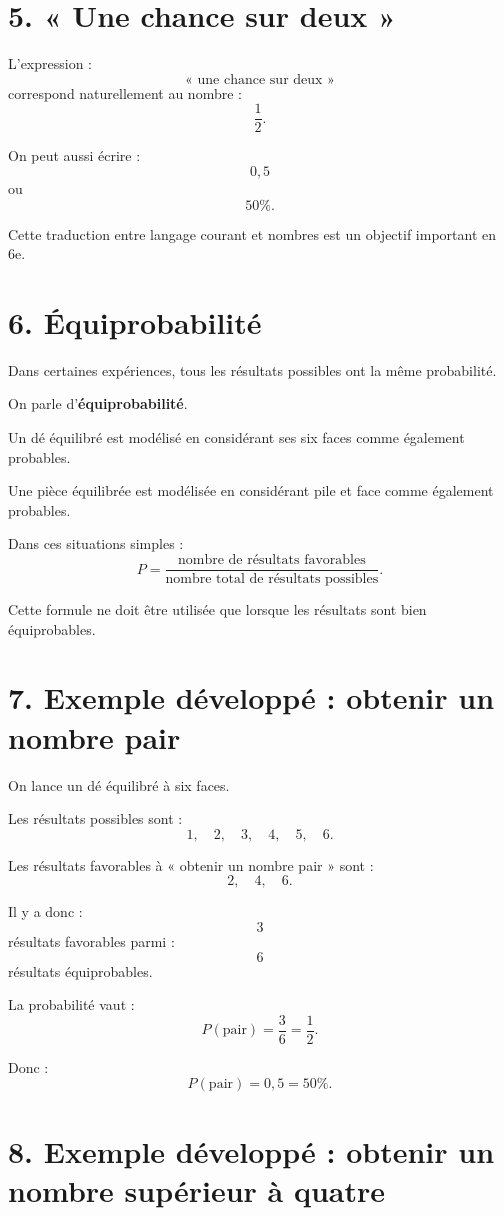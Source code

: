 \section{5. « Une chance sur deux »}

L'expression :
\[
\text{« une chance sur deux »}
\]
correspond naturellement au nombre :
\[
\dfrac12.
\]

On peut aussi écrire :
\[
0{,}5
\]
ou
\[
50\%.
\]

Cette traduction entre langage courant et nombres est un objectif important en 6e.

\section{6. Équiprobabilité}

Dans certaines expériences, tous les résultats possibles ont la même probabilité.

On parle d'\textbf{équiprobabilité}.

Un dé équilibré est modélisé en considérant ses six faces comme également probables.

Une pièce équilibrée est modélisée en considérant pile et face comme également probables.

Dans ces situations simples :
\[
P=\dfrac{\text{nombre de résultats favorables}}{\text{nombre total de résultats possibles}}.
\]

Cette formule ne doit être utilisée que lorsque les résultats sont bien équiprobables.

\section{7. Exemple développé : obtenir un nombre pair}

On lance un dé équilibré à six faces.

Les résultats possibles sont :
\[
1,\quad2,\quad3,\quad4,\quad5,\quad6.
\]

Les résultats favorables à « obtenir un nombre pair » sont :
\[
2,\quad4,\quad6.
\]

Il y a donc :
\[
3
\]
résultats favorables parmi :
\[
6
\]
résultats équiprobables.

La probabilité vaut :
\[
P(\text{pair})=\dfrac36=\dfrac12.
\]

Donc :
\[
\boxed{P(\text{pair})=0{,}5=50\%}.
\]

\section{8. Exemple développé : obtenir un nombre supérieur à quatre}

